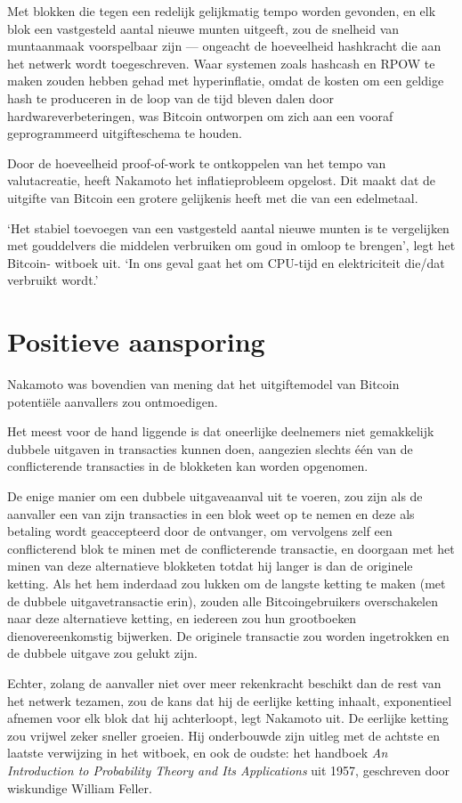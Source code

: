\documentclass[
  a5paper,
  smalldemyvopaper,11pt,twoside,onecolumn,openright,extrafontsizes,
hidelinks]{memoir}
\begin{document}
Met blokken die tegen een redelijk gelijkmatig tempo worden gevonden, en
elk blok een vastgesteld aantal nieuwe munten uitgeeft, zou de snelheid
van muntaanmaak voorspelbaar zijn --- ongeacht de hoeveelheid hashkracht
die aan het netwerk wordt toegeschreven. Waar systemen zoals hashcash en
RPOW te maken zouden hebben gehad met hyperinflatie, omdat de kosten om
een geldige hash te produceren in de loop van de tijd bleven dalen door
hardwareverbeteringen, was Bitcoin ontworpen om zich aan een vooraf
geprogrammeerd uitgifteschema te houden.

Door de hoeveelheid proof-of-work te ontkoppelen van het tempo van
valutacreatie, heeft Nakamoto het inflatieprobleem opgelost. Dit maakt
dat de uitgifte van Bitcoin een grotere gelijkenis heeft met die van een
edelmetaal.

`Het stabiel toevoegen van een vastgesteld aantal nieuwe munten is te
vergelijken met gouddelvers die middelen verbruiken om goud in omloop te
brengen', legt het Bitcoin- witboek uit. `In ons geval gaat het om
CPU-tijd en elektriciteit die/dat verbruikt wordt.'

\section{Positieve aansporing}\label{positieve-aansporing}

Nakamoto was bovendien van mening dat het uitgiftemodel van Bitcoin
potentiële aanvallers zou ontmoedigen.

Het meest voor de hand liggende is dat oneerlijke deelnemers niet
gemakkelijk dubbele uitgaven in transacties kunnen doen, aangezien
slechts één van de conflicterende transacties in de blokketen kan worden
opgenomen.

De enige manier om een dubbele uitgaveaanval uit te voeren, zou zijn als
de aanvaller een van zijn transacties in een blok weet op te nemen en
deze als betaling wordt geaccepteerd door de ontvanger, om vervolgens
zelf een conflicterend blok te minen met de conflicterende transactie,
en doorgaan met het minen van deze alternatieve blokketen totdat hij
langer is dan de originele ketting. Als het hem inderdaad zou lukken om
de langste ketting te maken (met de dubbele uitgavetransactie erin),
zouden alle Bitcoingebruikers overschakelen naar deze alternatieve
ketting, en iedereen zou hun grootboeken dienovereenkomstig bijwerken.
De originele transactie zou worden ingetrokken en de dubbele uitgave zou
gelukt zijn.

Echter, zolang de aanvaller niet over meer rekenkracht beschikt dan de
rest van het netwerk tezamen, zou de kans dat hij de eerlijke ketting
inhaalt, exponentieel afnemen voor elk blok dat hij achterloopt, legt
Nakamoto uit. De eerlijke ketting zou vrijwel zeker sneller groeien. Hij
onderbouwde zijn uitleg met de achtste en laatste verwijzing in het
witboek, en ook de oudste: het handboek \emph{An Introduction to
Probability Theory and Its Applications} uit 1957, geschreven door
wiskundige William Feller.
\end{document}
